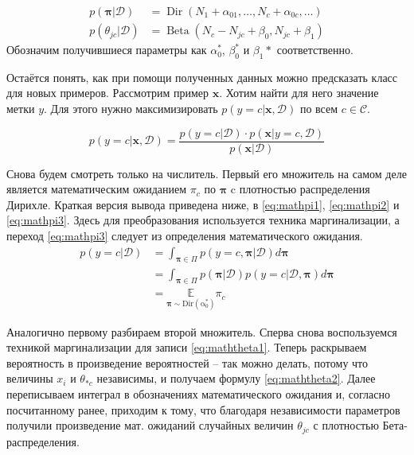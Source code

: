 \begin{align}
  p(\mathbf{\pi}|\mathcal{D}) &= \operatorname{Dir}(N_1+\alpha_{01},\ldots,N_c+\alpha_{0c},\ldots)\label{eq:pi}\\
  p(\theta_{jc}|\mathcal{D}) &= \operatorname{Beta}(N_c-N_{jc} + \beta_0, N_{jc}+\beta_1) \label{eq:thetajc}
\end{align}
Обозначим получившиеся параметры как $\alpha_0^*$, $\beta_0^*$ и $\beta_1*$ соответственно.

Остаётся понять, как при помощи полученных данных можно предсказать класс для новых
примеров. Рассмотрим пример $\mathbf{x}$. Хотим найти для него значение метки $y$. Для этого нужно
максимизировать $p(y=c|\mathbf{x},\mathcal{D})$ по всем $c\in\mathcal{C}$.

\begin{equation}
  p(y=c|\mathbf{x},\mathcal{D}) =
  \frac{p(y=c|\mathcal{D})\cdot p(\mathbf{x}|y=c,\mathcal{D})}{p(\mathbf{x}|\mathcal{D})}
  \label{eq:bnbpred}
\end{equation}

Снова будем смотреть только на числитель. Первый его множитель на самом деле является математическим
ожиданием $\pi_c$ по $\mathbf{\pi}$ c плотностью распределения Дирихле. Краткая версия вывода
приведена ниже, в \ref{eq:mathpi1}, \ref{eq:mathpi2} и \ref{eq:mathpi3}. Здесь для
преобразования \label{eq:mathpi1} используется техника маргинализации, а переход \ref{eq:mathpi3}
следует из определения математического ожидания.
\begin{align}
  p(y=c|\mathcal{D})&=\int_{\mathbf{\pi}\in\Pi}p(y=c,\mathbf{\pi}|\mathcal{D})d\mathbf{\pi}\label{eq:mathpi1}\\
  &= \int_{\mathbf{\pi}\in\Pi}p(\mathbf{\pi}|\mathcal{D})p(y=c|\mathcal{D},\mathbf{\pi})d\mathbf{\pi}\label{eq:mathpi2}\\
  &= \underset{\mathbf{\pi}\sim\operatorname{Dir(\alpha_0^*)}}{\mathbb{E}}\pi_c
  \label{eq:mathpi3}
\end{align}

Аналогично первому разбираем второй множитель. Сперва снова воспользуемся техникой маргинализации
для записи \ref{eq:maththeta1}. Теперь раскрываем вероятность  в произведение вероятностей
-- так можно делать, потому что величины $x_i$ и $\theta_{*c}$ независимы, и получаем формулу
\ref{eq:maththeta2}. Далее переписываем интеграл в обозначениях математического ожидания и, согласно
посчитанному ранее, приходим к тому, что благодаря независимости параметров получили произведение
мат. ожиданий случайных величин $\theta_{jc}$ с плотностью Бета-распределения.

